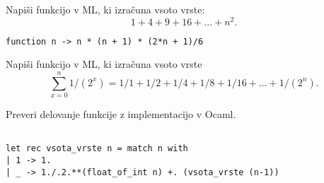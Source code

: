 \begin{ex}
Napi\v si funkcijo v ML, ki izra\v cuna vsoto vrste: 
$$1+4+9+16+...+n^2.$$

\begin{sol}
\begin{verbatim}
function n -> n * (n + 1) * (2*n + 1)/6
\end{verbatim}
\end{sol}

\end{ex}


\begin{ex}
Napi\v si funkcijo v ML, ki izra\v cuna vsoto vrste 
$$\sum_{x=0}^n 1/(2^x) = 1/1+1/2+1/4+1/8+1/16+...+1/(2^n).$$

Preveri delovanje funkcije z implementacijo v Ocaml.
\begin{sol}
\begin{verbatim}
    
let rec vsota_vrste n = match n with
| 1 -> 1.
| _ -> 1./.2.**(float_of_int n) +. (vsota_vrste (n-1))
\end{verbatim}
\end{sol}
\end{ex}

